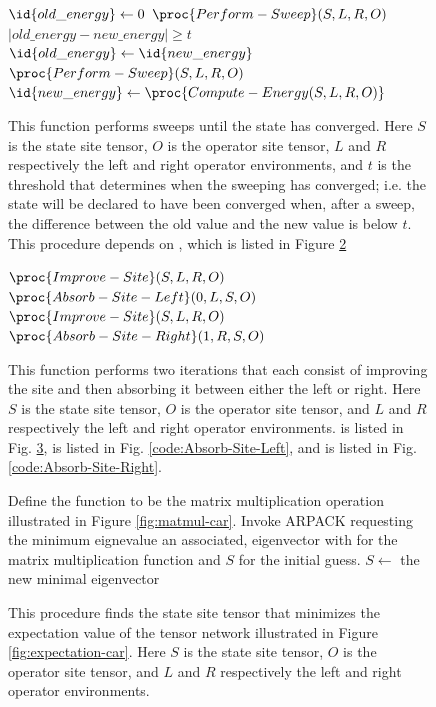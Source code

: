 \documentclass{article}
\begin{document}
\begin{figure}
\begin{codebox}
\li $\id{old\_energy} \gets 0$
\li $\proc{Perform-Sweep}(S,L,R,O)$
\li \While $|old\_energy-new\_energy| \ge t$
\li     \Do
\li         $\id{old\_energy} \gets \id{new\_energy}$
\li         $\proc{Perform-Sweep}(S,L,R,O)$
\li         $\id{new\_energy} \gets  \proc{Compute-Energy(S,L,R,O)}$
\end{codebox}
\caption{\label{code:Sweep-Until-Converged} This function performs sweeps until the state has converged. Here $S$ is the state site tensor, $O$ is the operator site tensor, $L$ and $R$ respectively the left and right operator environments, and $t$ is the threshold that determines when the sweeping has converged; i.e. the state will be declared to have been converged when, after a sweep, the difference between the old value and the new value is below $t$.  This procedure depends on , which is listed in Figure \ref{code:Perform-Sweep}}
\end{figure}

\begin{figure}
\begin{codebox}
\li $\proc{Improve-Site}(S,L,R,O)$
\li $\proc{Absorb-Site-Left}(0,L,S,O)$
\li $\proc{Improve-Site}(S,L,R,O)$
\li $\proc{Absorb-Site-Right}(1,R,S,O)$
\end{codebox}
\caption{\label{code:Perform-Sweep} This function performs two iterations that each consist of improving the site and then absorbing it between either the left or right.  Here $S$ is the state site tensor, $O$ is the operator site tensor, and $L$ and $R$ respectively the left and right operator environments.   is listed in Fig. \ref{code:Improve-Site},  is listed in Fig. \ref{code:Absorb-Site-Left}, and  is listed in Fig. \ref{code:Absorb-Site-Right}.}
\end{figure}

\begin{figure}
\begin{codebox}
\li Define the function  to be the matrix multiplication operation
\zi illustrated in Figure \ref{fig:matmul-car}.
\li Invoke ARPACK requesting the minimum eignevalue an associated,
\zi eigenvector with  for the matrix multiplication function and
\zi $S$ for the initial guess.
\li $S \gets$ the new minimal eigenvector
\end{codebox}
\caption{\label{code:Improve-Site}This procedure finds the state site tensor that minimizes the expectation value of the tensor network illustrated in Figure \ref{fig:expectation-car}. Here $S$ is the state site tensor, $O$ is the operator site tensor, and $L$ and $R$ respectively the left and right operator environments.}
\end{figure}
\end{document}
